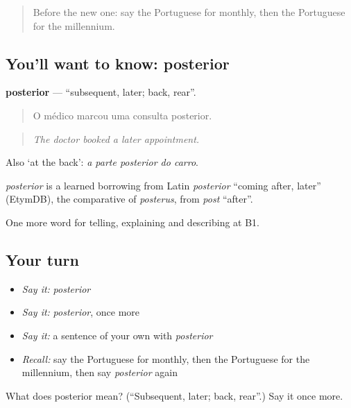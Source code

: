 \label{lesson:PT-C276-posterior}



\begin{quote}
Before the new one: say the Portuguese for monthly, then the Portuguese for the millennium.
\end{quote}

\subsection*{You'll want to know: posterior}
\textbf{posterior} — \textquotedblleft{}subsequent, later; back, rear\textquotedblright{}.

\begin{quote}
O médico marcou uma consulta posterior.
\end{quote}

\begin{quote}
\emph{The doctor booked a later appointment.}
\end{quote}

Also ‘at the back’: \emph{a parte posterior do carro}.

\begin{cousinweb}
\emph{posterior} is a learned borrowing from Latin \emph{posterior} \textquotedblleft{}coming after, later\textquotedblright{} (EtymDB), the comparative of \emph{posterus}, from \emph{post} \textquotedblleft{}after\textquotedblright{}.
\end{cousinweb}

\begin{grammarlens}[title={What you've built}]
One more word for telling, explaining and describing at B1.
\end{grammarlens}

\subsection*{Your turn}
\begin{itemize}
\raggedright
  \item \emph{Say it:} \emph{posterior}
  \item \emph{Say it:} \emph{posterior}, once more
  \item \emph{Say it:} a sentence of your own with \emph{posterior}
  \item \emph{Recall:} say the Portuguese for monthly, then the Portuguese for the millennium, then say \emph{posterior} again
\end{itemize}

\begin{tcolorbox}[breakable,colback=teal!4,colframe=teal!35!black,title={Before you move on}]
What does posterior mean? (\textquotedblleft{}Subsequent, later; back, rear\textquotedblright{}.) Say it once more.
\end{tcolorbox}
